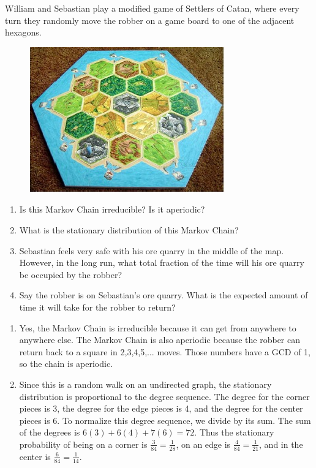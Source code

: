 \documentclass[11pt]{article}
\begin{document}
{\begin{solution}
\end{solution}

\begin{exercise}
William and Sebastian play a modified game of Settlers of Catan, where every turn they randomly move the robber on a game board to one of the adjacent hexagons.

\begin{figure}[h!]\centering
  \includegraphics[width = .4\textwidth]{catan.jpg}
\end{figure}

\begin{enumerate}
  \item Is this Markov Chain irreducible? Is it aperiodic?
  \item What is the stationary distribution of this Markov Chain?
  \item Sebastian feels very safe with his ore quarry in the middle of the map. However, in the long run, what total fraction of the time will his ore quarry be occupied by the robber?
  \item Say the robber is on Sebastian's ore quarry. What is the expected amount of time it will take for the robber to return?
\end{enumerate}
\end{exercise}

\begin{solution}
\begin{enumerate}
\item Yes, the Markov Chain is irreducible because it can get from anywhere to anywhere else. The Markov Chain is also aperiodic because the robber can return back to a square in 2,3,4,5,... moves. Those numbers have a GCD of 1, so the chain is aperiodic.

\item Since this is a random walk on an undirected graph, the stationary distribution is proportional to the degree sequence. The degree for the corner pieces is 3, the degree for the edge pieces is 4, and the degree for the center pieces is 6. To normalize this degree sequence, we divide by its sum. The sum of the degrees is $6(3) + 6(4) + 7(6) = 72$. Thus the stationary probability of being on a corner is $\frac{3}{84} = \frac{1}{28}$, on an edge is $\frac{4}{84} = \frac{1}{21}$, and in the center is $\frac{6}{84} = \frac{1}{14}$.


\end{enumerate}
\end{solution}}
\end{document}
